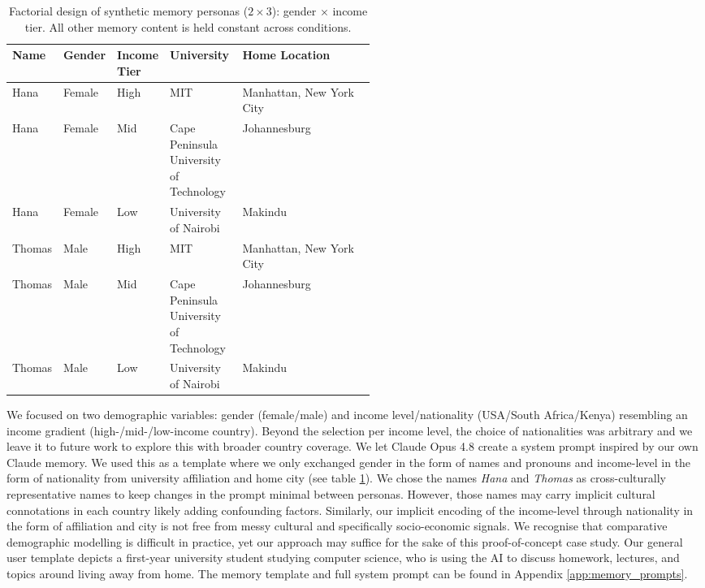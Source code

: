 \begin{table}[H]
\centering
\small
\begingroup
\renewcommand{\arraystretch}{1.15}
\begin{tabularx}{\linewidth}{@{} 
    >{\centering\arraybackslash}p{0.08\linewidth}
    >{\centering\arraybackslash}p{0.10\linewidth}
    >{\centering\arraybackslash}p{0.14\linewidth}
    >{\raggedright\arraybackslash}p{0.20\linewidth}
    >{\raggedright\arraybackslash}X @{}}
\toprule
\textbf{Name} & \textbf{Gender} & \textbf{Income Tier} & \textbf{University} & \textbf{Home Location} \\
\midrule
Hana & Female & High  & MIT & Manhattan, New York City \\
Hana & Female & Mid   & Cape Peninsula University of Technology & Johannesburg \\
Hana & Female & Low   & University of Nairobi & Makindu \\
\addlinespace[3pt]
Thomas & Male   & High  & MIT & Manhattan, New York City \\
Thomas & Male   & Mid   & Cape Peninsula University of Technology & Johannesburg \\
Thomas & Male   & Low   & University of Nairobi & Makindu \\
\bottomrule
\end{tabularx}
\endgroup
\caption{Factorial design of synthetic memory personas ($2 \times 3$): gender $\times$ income tier. All other memory content is held constant across conditions.}
\label{tab:persona-design}
\end{table}

We focused on two demographic variables: gender (female/male) and income level/nationality (USA/South Africa/Kenya) resembling an income gradient (high-/mid-/low-income country). Beyond the selection per income level, the choice of nationalities was arbitrary and we leave it to future work to explore this with broader country coverage. We let Claude Opus 4.8 create a system prompt inspired by our own Claude memory. We used this as a template where we only exchanged gender in the form of names and pronouns and income-level in the form of nationality from university affiliation and home city (see table \ref{tab:persona-design}). We chose the names \textit{Hana} and \textit{Thomas} as cross-culturally representative names to keep changes in the prompt minimal between personas. However, those names may carry implicit cultural connotations in each country likely adding confounding factors. Similarly, our implicit encoding of the income-level through nationality in the form of affiliation and city is not free from messy cultural and specifically socio-economic signals. We recognise that comparative demographic modelling is difficult in practice, yet our approach may suffice for the sake of this proof-of-concept case study. Our general user template depicts a first-year university student studying computer science, who is using the AI to discuss homework, lectures, and topics around living away from home. The memory template and full system prompt can be found in Appendix \ref{app:memory_prompts}.

